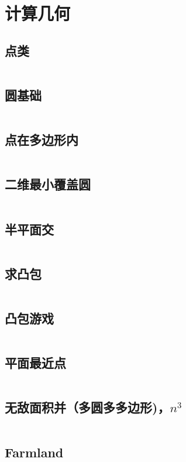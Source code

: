\chapter{计算几何}
\section{点类}
\inputminted{cpp}{\source/computational-geometry/point.cpp}
\section{圆基础}
\inputminted{cpp}{\source/computational-geometry/circle.cpp}
\section{点在多边形内}
\inputminted{cpp}{\source/computational-geometry/point-in-polygon.cpp}
\section{二维最小覆盖圆}
\inputminted{cpp}{\source/computational-geometry/mincir.cpp}
\section{半平面交}
\inputminted{cpp}{\source/computational-geometry/halfplaneintersection.cpp}
\section{求凸包}
\inputminted{cpp}{\source/computational-geometry/convex-hull.cpp}
\section{凸包游戏}
\inputminted{cpp}{\source/computational-geometry/PlayWithConvex.cpp}
\section{平面最近点}
\inputminted{cpp}{\source/computational-geometry/closest-pair-of-points.cpp}
\section{无敌面积并（多圆多多边形)，$n^3$}
\inputminted{cpp}{\source/computational-geometry/area_union.cpp}
\section{Farmland}
\inputminted{cpp}{\source/computational-geometry/farmland.cpp}
